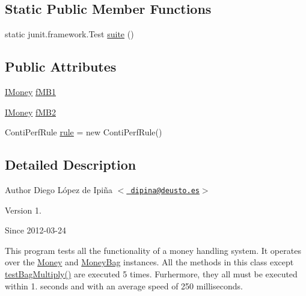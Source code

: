 \subsection*{Static Public Member Functions}
\begin{DoxyCompactItemize}
\item 
static junit.\+framework.\+Test \mbox{\hyperlink{classes_1_1deusto_1_1testing_1_1junit_1_1_money_perf_test_a055d5d73134dccc41be33a91dc75e529}{suite}} ()
\end{DoxyCompactItemize}
\subsection*{Public Attributes}
\begin{DoxyCompactItemize}
\item 
\mbox{\hyperlink{interfacees_1_1deusto_1_1testing_1_1junit_1_1_i_money}{I\+Money}} \mbox{\hyperlink{classes_1_1deusto_1_1testing_1_1junit_1_1_money_perf_test_a6a9b4b1c2c0619dff88b70726d450f47}{f\+M\+B1}}
\item 
\mbox{\hyperlink{interfacees_1_1deusto_1_1testing_1_1junit_1_1_i_money}{I\+Money}} \mbox{\hyperlink{classes_1_1deusto_1_1testing_1_1junit_1_1_money_perf_test_afc2a16546078fb7a54e1493fd3fb7db2}{f\+M\+B2}}
\item 
Conti\+Perf\+Rule \mbox{\hyperlink{classes_1_1deusto_1_1testing_1_1junit_1_1_money_perf_test_abe69d703cb5d31c06982cd9317f534bd}{rule}} = new Conti\+Perf\+Rule()
\end{DoxyCompactItemize}


\subsection{Detailed Description}
\begin{DoxyAuthor}{Author}
Diego López de Ipiña $<$\href{mailto:dipina@deusto.es}{\texttt{ dipina@deusto.\+es}}$>$ 
\end{DoxyAuthor}
\begin{DoxyVersion}{Version}
1.
\end{DoxyVersion}
\begin{DoxySince}{Since}
2012-\/03-\/24
\end{DoxySince}


This program tests all the functionality of a money handling system. It operates over the \mbox{\hyperlink{classes_1_1deusto_1_1testing_1_1junit_1_1_money}{Money}} and \mbox{\hyperlink{classes_1_1deusto_1_1testing_1_1junit_1_1_money_bag}{Money\+Bag}} instances. All the methods in this class except \mbox{\hyperlink{classes_1_1deusto_1_1testing_1_1junit_1_1_money_perf_test_ac5217e7f852f78dde2575d39a7186110}{test\+Bag\+Multiply()}} are executed 5 times. Furhermore, they all must be executed within 1. seconds and with an average speed of 250 milliseconds. 

